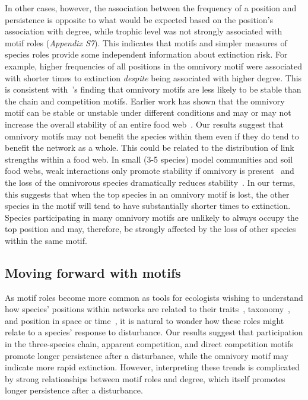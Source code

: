 \documentclass[12pt]{article}
\begin{document}
\begin{spacing}{1.0}
        
        In other cases, however, the association between the frequency of a position and persistence is opposite to what would be expected based on the position's association with degree, while trophic level was not strongly associated with motif roles (\emph{Appendix S7}).
        This indicates that motifs and simpler measures of species roles provide some independent information about extinction risk.
        For example, higher frequencies of all positions in the omnivory motif were associated with shorter times to extinction \emph{despite} being associated with higher degree.
        This is consistent with~\citet{Borrelli2015a}'s finding that omnivory motifs are less likely to be stable than the chain and competition motifs.
        Earlier work has shown that the omnivory motif can be stable or unstable under different conditions and may or may not increase the overall stability of an entire food web~\citep{McCann1997,Emmerson2004,Borrelli2015a,Monteiro2016}.
        Our results suggest that omnivory motifs may not benefit the species within them even if they do tend to benefit the network as a whole.
        This could be related to the distribution of link strengths within a food web.
        In small (3-5 species) model communities and soil food webs, weak interactions only promote stability if omnivory is present~\citep{Neutel2002,Emmerson2004} and the loss of the omnivorous species dramatically reduces stability~\citep{Emmerson2004}.
        In our terms, this suggests that when the top species in an omnivory motif is lost, the other species in the motif will tend to have substantially shorter times to extinction.
        Species participating in many omnivory motifs are unlikely to always occupy the top position and may, therefore, be strongly affected by the loss of other species within the same motif.
        

	\subsection*{Moving forward with motifs}	

        As motif roles become more common as tools for ecologists wishing to understand how species' positions within networks are related to their traits~\citep{Cirtwill2018EcolLett}, taxonomy~\citep{Stouffer2007}, and position in space or time~\citep{Baker2015}, it is natural to wonder how these roles might relate to a species' response to disturbance. 
        Our results suggest that participation in the three-species chain, apparent competition, and direct competition motifs promote longer persistence after a disturbance, while the omnivory motif may indicate more rapid extinction.
        However, interpreting these trends is complicated by strong relationships between motif roles and degree, which itself promotes longer persistence after a disturbance.
        

\end{spacing}
\end{document}
